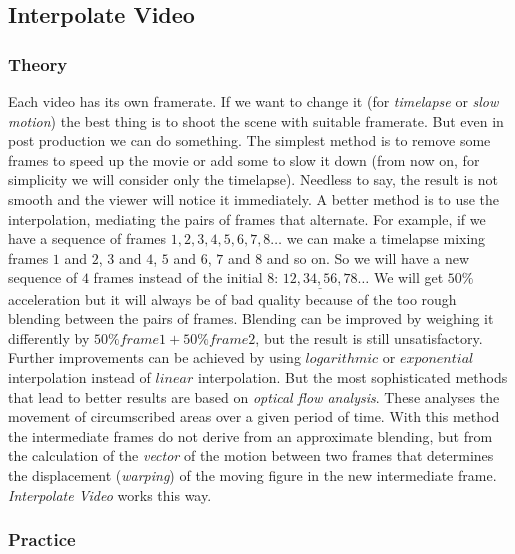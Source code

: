 \subsection{Interpolate Video}%
\label{sub:interpolate_video}

\subsubsection*{Theory}
\label{ssub:theory}

Each video has its own framerate. If we want to change it (for \textit{timelapse} or \textit{slow motion}) the best thing is to shoot the scene with suitable framerate. But even in post production we can do something. The simplest method is to remove some frames to speed up the movie or add some to slow it down (from now on, for simplicity we will consider only the timelapse). Needless to say, the result is not smooth and the viewer will notice it immediately. A better method is to use the interpolation, mediating the pairs of frames that alternate. For example, if we have a sequence of frames $1, 2, 3, 4, 5, 6, 7, 8\dots$ we can make a timelapse mixing frames $1$ and $2$, $3$ and $4$, $5$ and $6$, $7$ and $8$ and so on. So we will have a new sequence of $4$ frames instead of the initial $8$: $\underline{12, 34, 56, 78}\dots$ We will get $50\%$ acceleration but it will always be of bad quality because of the too rough blending between the pairs of frames. Blending can be improved by weighing it differently by $50\% frame 1 + 50\% frame 2$, but the result is still unsatisfactory. Further improvements can be achieved by using $logarithmic$ or $exponential$ interpolation instead of $linear$ interpolation. But the most sophisticated methods that lead to better results are based on \textit{optical flow analysis}. These analyses the movement of circumscribed areas over a given period of time. With this method the intermediate frames do not derive from an approximate blending, but from the calculation of the \textit{vector} of the motion between two frames that determines the displacement (\textit{warping}) of the moving figure in the new intermediate frame. \textit{Interpolate Video} works this way.

\subsubsection*{Practice}
\label{ssub:practice}

